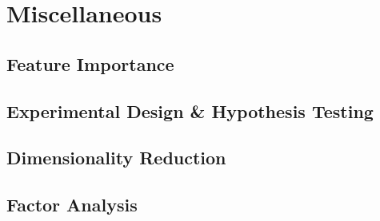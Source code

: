 \chapter{Miscellaneous}
\label{chap:misc}

\section{Feature Importance}
\label{misc:feature_importance}

\section{Experimental Design \& Hypothesis Testing}
\label{misc:exp_design}

\section{Dimensionality Reduction}
\label{misc:m_reduction}

\section{Factor Analysis}
\label{misc:factor_ana}

